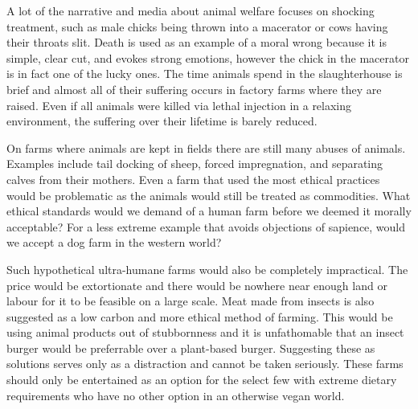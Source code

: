 A lot of the narrative and media about animal welfare focuses on shocking treatment, such as male chicks being thrown into a macerator or cows having their throats slit. Death is used as an example of a moral wrong because it is simple, clear cut, and evokes strong emotions, however the chick in the macerator is in fact one of the lucky ones. The time animals spend in the slaughterhouse is brief and almost all of their suffering occurs in factory farms where they are raised. Even if all animals were killed via lethal injection in a relaxing environment, the suffering over their lifetime is barely reduced.

On farms where animals are kept in fields there are still many abuses of animals. Examples include tail docking of sheep, forced impregnation, and separating calves from their mothers. Even a farm that used the most ethical practices would be problematic as the animals would still be treated as commodities. What ethical standards would we demand of a human farm before we deemed it morally acceptable? For a less extreme example that avoids objections of sapience, would we accept a dog farm in the western world?

Such hypothetical ultra-humane farms would also be completely impractical. The price would be extortionate and there would be nowhere near enough land or labour for it to be feasible on a large scale. Meat made from insects is also suggested as a low carbon and more ethical method of farming. This would be using animal products out of stubbornness and it is unfathomable that an insect burger would be preferrable over a plant-based burger. Suggesting these as solutions serves only as a distraction and cannot be taken seriously. These farms should only be entertained as an option for the select few with extreme dietary requirements who have no other option in an otherwise vegan world.